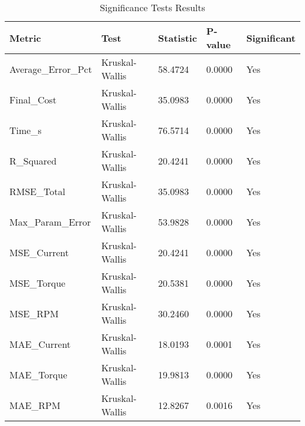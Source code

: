 \begin{table}
\caption{Significance Tests Results}
\label{tab:significance_tests}
\begin{tabular}{lllll}
\toprule
Metric & Test & Statistic & P-value & Significant \\
\midrule
Average_Error_Pct & Kruskal-Wallis & 58.4724 & 0.0000 & Yes \\
Final_Cost & Kruskal-Wallis & 35.0983 & 0.0000 & Yes \\
Time_s & Kruskal-Wallis & 76.5714 & 0.0000 & Yes \\
R_Squared & Kruskal-Wallis & 20.4241 & 0.0000 & Yes \\
RMSE_Total & Kruskal-Wallis & 35.0983 & 0.0000 & Yes \\
Max_Param_Error & Kruskal-Wallis & 53.9828 & 0.0000 & Yes \\
MSE_Current & Kruskal-Wallis & 20.4241 & 0.0000 & Yes \\
MSE_Torque & Kruskal-Wallis & 20.5381 & 0.0000 & Yes \\
MSE_RPM & Kruskal-Wallis & 30.2460 & 0.0000 & Yes \\
MAE_Current & Kruskal-Wallis & 18.0193 & 0.0001 & Yes \\
MAE_Torque & Kruskal-Wallis & 19.9813 & 0.0000 & Yes \\
MAE_RPM & Kruskal-Wallis & 12.8267 & 0.0016 & Yes \\
\bottomrule
\end{tabular}
\end{table}
